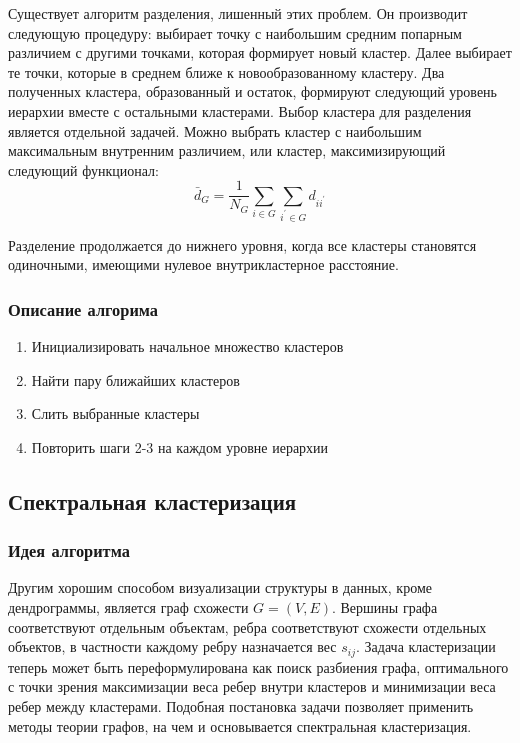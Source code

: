 Существует алгоритм разделения, лишенный этих проблем. Он производит следующую процедуру: выбирает точку с наибольшим средним попарным различием с другими точками, которая формирует новый кластер. Далее выбирает те точки, которые в среднем ближе к новообразованному кластеру. Два полученных кластера, образованный и остаток, формируют следующий уровень иерархии вместе с остальными кластерами. Выбор кластера для разделения является отдельной задачей. Можно выбрать кластер с наибольшим максимальным внутренним различием, или кластер, максимизирующий следующий функционал:
\begin{equation}
	\bar{d}_G = \frac{1}{N_G} \sum_{i \in G} \sum_{i^\prime \in G} d_{ii^\prime}
\end{equation}

Разделение продолжается до нижнего уровня, когда все кластеры становятся одиночными, имеющими нулевое внутрикластерное расстояние.

\subsubsection{Описание алгорима}
\begin{enumerate}
	\item Инициализировать начальное множество кластеров
	\item Найти пару ближайших кластеров
	\item Слить выбранные кластеры
	\item Повторить шаги 2-3 на каждом уровне иерархии
\end{enumerate}

\subsection{Спектральная кластеризация}
\subsubsection{Идея алгоритма}
Другим хорошим способом визуализации структуры в данных, кроме дендрограммы, является граф схожести $G = (V,E)$. Вершины графа соответствуют отдельным объектам, ребра соответствуют схожести отдельных объектов, в частности каждому ребру назначается вес $s_{ij}$. Задача кластеризации теперь может быть переформулирована как поиск разбиения графа, оптимального с точки зрения максимизации веса ребер внутри кластеров и минимизации веса ребер между кластерами. Подобная постановка задачи позволяет применить методы теории графов, на чем и основывается спектральная кластеризация\cite{von2007tutorial}.

